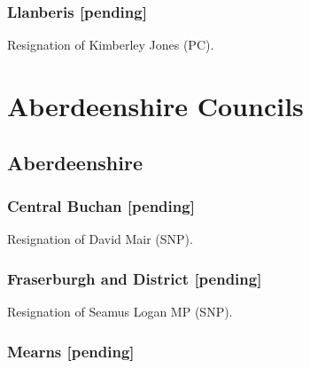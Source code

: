 \documentclass[a4paper,openany]{book}
\begin{document}
\begin{resultsiii}
\subsubsection*{Llanberis \hspace*{\fill}\nolinebreak[1]%
	\enspace\hspace*{\fill}
	[pending]}


Resignation of Kimberley Jones (PC).

\section{Aberdeenshire Councils}

\subsection*{Aberdeenshire}

\subsubsection*{Central Buchan \hspace*{\fill}\nolinebreak[1]%
	\enspace\hspace*{\fill}
	[pending]}


Resignation of David Mair (SNP).

\subsubsection*{Fraserburgh and District \hspace*{\fill}\nolinebreak[1]%
	\enspace\hspace*{\fill}
	[pending]}


Resignation of Seamus Logan MP (SNP).

\subsubsection*{Mearns \hspace*{\fill}\nolinebreak[1]%
	\enspace\hspace*{\fill}
	[pending]}


\end{resultsiii}
\end{document}
